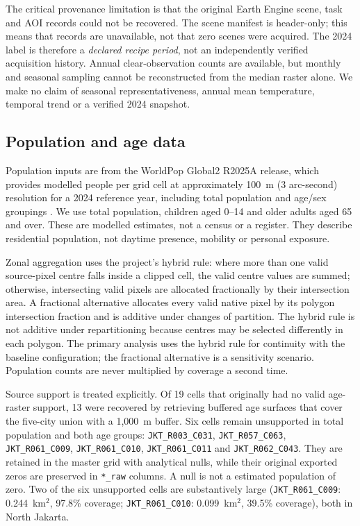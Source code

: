 \documentclass[times,twoside]{_Templates/MultiTargetManuscript}
\begin{document}
The critical provenance limitation is that the original Earth Engine scene,
task and AOI records could not be recovered. The scene manifest is header-only;
this means that records are unavailable, not that zero scenes were acquired.
The 2024 label is therefore a \emph{declared recipe period}, not an
independently verified acquisition history. Annual clear-observation counts are
available, but monthly and seasonal sampling cannot be reconstructed from the
median raster alone. We make no claim of seasonal representativeness, annual mean
temperature, temporal trend or a verified 2024 snapshot.

\subsection{Population and age data}

Population inputs are from the WorldPop Global2 R2025A release, which provides
modelled people per grid cell at approximately 100~m (3 arc-second) resolution
for a 2024 reference year, including total population and age/sex groupings
\citep{worldpop2025}. We use total population, children aged 0--14 and older
adults aged 65 and over. These are modelled estimates, not a census or a
register. They describe residential population, not daytime presence, mobility
or personal exposure.

Zonal aggregation uses the project's hybrid rule: where more than one valid
source-pixel centre falls inside a clipped cell, the valid centre values are
summed; otherwise, intersecting valid pixels are allocated fractionally by
their intersection area. A fractional alternative allocates every valid native
pixel by its polygon intersection fraction and is additive under changes of
partition. The hybrid rule is not additive under repartitioning because centres
may be selected differently in each polygon. The primary analysis uses the
hybrid rule for continuity with the baseline configuration; the fractional alternative
is a sensitivity scenario. Population counts are never multiplied by coverage a
second time.

Source support is treated explicitly. Of 19 cells that originally had no valid
age-raster support, 13 were recovered by retrieving buffered age surfaces that
cover the five-city union with a 1,000~m buffer. Six cells remain unsupported in
total population and both age groups:
\texttt{JKT\_R003\_C031}, \texttt{JKT\_R057\_C063},
\texttt{JKT\_R061\_C009}, \texttt{JKT\_R061\_C010},
\texttt{JKT\_R061\_C011} and \texttt{JKT\_R062\_C043}. They are retained in the
master grid with analytical nulls, while their original exported zeros are
preserved in \texttt{*\_raw} columns. A null is not a estimated population of
zero. Two of the six unsupported cells are substantively large
(\texttt{JKT\_R061\_C009}: 0.244~km$^2$, 97.8\% coverage;
\texttt{JKT\_R061\_C010}: 0.099~km$^2$, 39.5\% coverage), both in North Jakarta.
\end{document}
